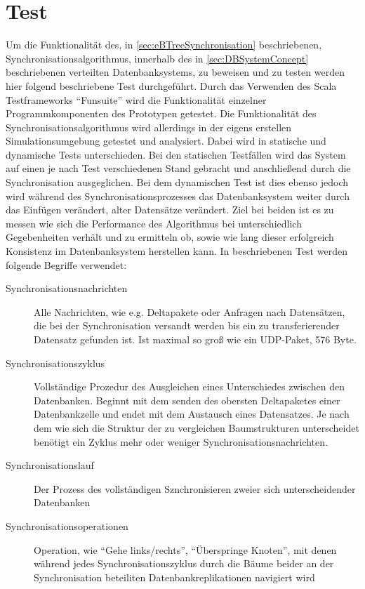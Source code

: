 \documentclass[a4paper,11pt,oneside,%
headsepline,												%
footsepline,												%
bibtotocnumbered									%
]{scrreprt}
\begin{document}
\chapter{Test}
Um die Funktionalität des, in \autoref{sec:eBTreeSynchronisation} beschriebenen, Synchronisationsalgorithmus, innerhalb des in \autoref{sec:DBSystemConcept}	beschriebenen verteilten Datenbanksystems, zu beweisen und zu testen werden hier folgend beschriebene Test durchgeführt. Durch das Verwenden des Scala Testframeworks \enquote{Funsuite} wird die Funktionalität einzelner Programmkomponenten des Prototypen getestet. Die Funktionalität des Synchronisationsalgorithmus wird allerdings in der eigens erstellen Simulationsumgebung getestet und analysiert. Dabei wird in statische und dynamische Tests unterschieden. Bei den statischen Testfällen wird das System auf einen je nach Test verschiedenen Stand gebracht und anschließend durch die Synchronisation ausgeglichen. Bei dem dynamischen Test ist dies ebenso jedoch wird während des Synchronisationsprozesses das Datenbanksystem weiter durch das Einfügen verändert, alter Datensätze verändert. Ziel bei beiden ist es zu messen wie sich die Performance des Algorithmus bei unterschiedlich Gegebenheiten verhält und zu ermitteln ob, sowie wie lang dieser erfolgreich Konsistenz im Datenbanksystem herstellen kann. In beschriebenen Test werden folgende Begriffe verwendet:
\begin{description}
	\item[Synchronisationsnachrichten] Alle Nachrichten, wie  e.g. Deltapakete oder Anfragen nach Datensätzen, die bei der Synchronisation versandt werden bis ein zu transferierender Datensatz gefunden ist. Ist maximal so groß wie ein UDP-Paket, 576 Byte.
	\item[Synchronisationszyklus] Vollständige Prozedur des Ausgleichen eines Unterschiedes zwischen den Datenbanken. Beginnt mit dem senden des obersten Deltapaketes einer Datenbankzelle und endet mit dem Austausch eines Datensatzes. Je nach dem wie sich die Struktur der zu vergleichen Baumstrukturen unterscheidet benötigt ein Zyklus mehr oder weniger Synchronisationsnachrichten.
	\item[Synchronisationslauf] Der Prozess des vollständigen Sznchronisieren zweier sich unterscheidender Datenbanken
	\item[Synchronisationsoperationen] Operation, wie \enquote{Gehe links/rechts}, \enquote{Überspringe Knoten}, mit denen während jedes Synchronisationszyklus durch die Bäume beider an der Synchronisation beteiliten Datenbankreplikationen navigiert wird
\end{description}
\end{document}
